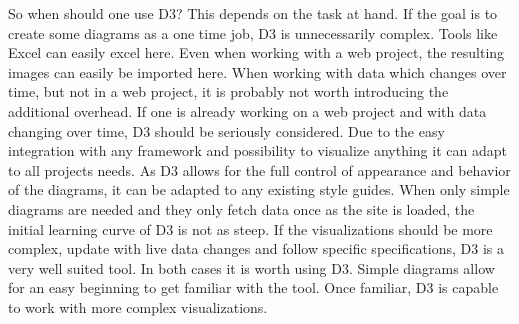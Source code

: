 So when should one use D3? This depends on the task at hand. If the goal is to create some diagrams as a one time job, D3 is unnecessarily complex. Tools like Excel can easily excel here. Even when working with a web project, the resulting images can easily be imported here. When working with data which changes over time, but not in a web project, it is probably not worth introducing the additional overhead. If one is already working on a web project and with data changing over time, D3 should be seriously considered. Due to the easy integration with any framework and possibility to visualize anything it can adapt to all projects needs. As D3 allows for the full control of appearance and behavior of the diagrams, it can be adapted to any existing style guides. When only simple diagrams are needed and they only fetch data once as the site is loaded, the initial learning curve of D3 is not as steep. If the visualizations should be more complex, update with live data changes and follow specific specifications, D3 is a very well suited tool. In both cases it is worth using D3. Simple diagrams allow for an easy beginning to get familiar with the tool. Once familiar, D3 is capable to work with more complex visualizations.
